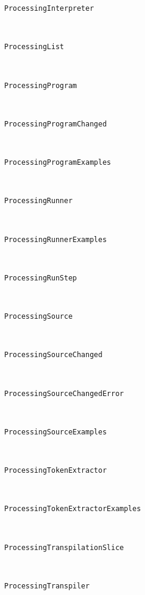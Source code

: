 \begin{description}
\item[\texttt{ProcessingInterpreter}] \hfill \\
	
\item[\texttt{ProcessingList}] \hfill \\
	
\item[\texttt{ProcessingProgram}] \hfill \\
	
\item[\texttt{ProcessingProgramChanged}] \hfill \\
	
\item[\texttt{ProcessingProgramExamples}] \hfill \\
	
\item[\texttt{ProcessingRunner}] \hfill \\
	
\item[\texttt{ProcessingRunnerExamples}] \hfill \\
	
\item[\texttt{ProcessingRunStep}] \hfill \\
	
\item[\texttt{ProcessingSource}] \hfill \\
	
\item[\texttt{ProcessingSourceChanged}] \hfill \\
	
\item[\texttt{ProcessingSourceChangedError}] \hfill \\
	
\item[\texttt{ProcessingSourceExamples}] \hfill \\
	
\item[\texttt{ProcessingTokenExtractor}] \hfill \\
	
\item[\texttt{ProcessingTokenExtractorExamples}] \hfill \\
	
\item[\texttt{ProcessingTranspilationSlice}] \hfill \\
	
\item[\texttt{ProcessingTranspiler}] \hfill \\
	

\end{description}
